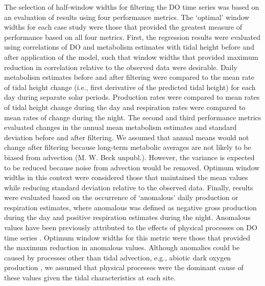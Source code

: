 \documentclass[letterpaper,12pt,oneside]{article}\usepackage[]{graphicx}\usepackage[]{color}
\begin{document}
The selection of half-window widths for filtering the \ac{DO} time series was based on an evaluation of results using four performance metrics.  The `optimal' window widths for each case study were those that provided the greatest measure of performance based on all four metrics.  First, the regression results were evaluated using correlations of \ac{DO} and metabolism estimates with tidal height before and after application of the model, such that window widths that provided maximum reduction in correlation relative to the observed data were desirable.  Daily metabolism estimates before and after filtering were compared to the mean rate of tidal height change (i.e., first derivative of the predicted tidal height) for each day during separate solar periods.  Production rates were compared to mean rates of tidal height change during the day and respiration rates were compared to mean rates of change during the night.  The second and third performance metrics evaluated changes in the annual mean metabolism estimates and standard deviation before and after filtering.  We assumed that annual means would not change after filtering because long-term metabolic averages are not likely to be biased from advection (M. W. Beck unpubl.).  However, the variance is expected to be reduced because noise from advection would be removed.  Optimum window widths in this context were considered those that maintained the mean values while reducing standard deviation relative to the observed data. Finally, results were evaluated based on the occurrence of `anomalous' daily production or respiration estimates, where anomalous was defined as negative gross production during the day and positive respiration estimates during the night.  Anomalous values have been previously attributed to the effects of physical processes on \ac{DO} time series \citep{Caffrey03}. Optimum window widths for this metric were those that provided the maximum reduction in anomalous values.  Although anomalies could be caused by processes other than tidal advection, e.g., abiotic dark oxygen production \citep{Pamatmat97}, we assumed that physical processes were the dominant cause of these values given the tidal characteristics at each site.
\end{document}
